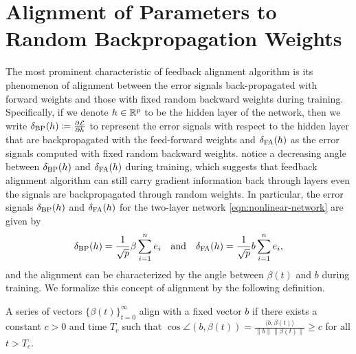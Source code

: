 
\section{Alignment of Parameters to Random Backpropagation Weights}\label{sec:alignment}

The most prominent characteristic of feedback alignment algorithm is its phenomenon of alignment between the error signals back-propagated with forward weights and those with fixed random backward weights during training. Specifically, if we denote $h\in \mathbb{R}^p$ to be the hidden layer of the network, then we write $\delta_\mathrm{BP}(h) \coloneqq \frac{\partial \mathcal{L}}{\partial h}$ to represent the error signals with respect to the hidden layer that are backpropagated with the feed-forward weights and $\delta_\mathrm{FA}(h)$ as the error signals computed with fixed random backward weights.
\citet{lillicrap2016random} notice a decreasing angle between $\delta_\mathrm{BP}(h)$ and $\delta_\mathrm{FA}(h)$ during training, which suggests that feedback alignment algorithm can still carry gradient information back through layers even the signals are backpropagated through random weights.
In particular, the error signals $\delta_\mathrm{BP}(h)$ and $\delta_\mathrm{FA}(h)$ for the two-layer network \eqref{eqn:nonlinear-network} are given by 
\begin{equation}
    \delta_\mathrm{BP}(h) = \frac{1}{\sqrt{p}}\beta\sum_{i=1}^ne_i \quad\text{and}\quad \delta_\mathrm{FA}(h) = \frac{1}{\sqrt{p}}b\sum_{i=1}^ne_i,
\end{equation}
and the alignment can be characterized by the angle between $\beta(t)$ and $b$ during training. We formalize this concept of alignment by the following definition.
\begin{definition}\label{def:alignment}
    A series of vectors $\{\beta(t)\}_{t=0}^\infty$ align with a fixed vector $b$ if there exists a constant $c>0$ and time $T_c$ such that  $\cos\angle(b, \beta(t)) = \frac{\langle b, \beta(t)\rangle}{\|b\|\|\beta(t)\|} \geq c$ for all $t > T_c$.
\end{definition}

